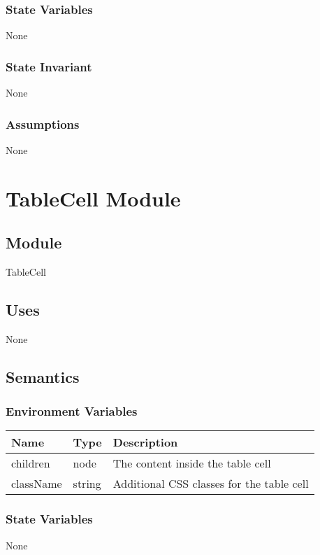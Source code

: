 \documentclass[12pt]{article}
\begin{document}
\subsubsection{State Variables}
None

\subsubsection{State Invariant}
None

\subsubsection{Assumptions}
None

\newpage


\section{TableCell Module}

\subsection{Module}
TableCell

\subsection{Uses}
None

\subsection{Semantics}

\subsubsection{Environment Variables}
\begin{tabular}{| l | l | p{10cm} |}
    \hline
    \textbf{Name} & \textbf{Type} & \textbf{Description}\\ \hline
    children & node & The content inside the table cell\\ \hline
    className & string & Additional CSS classes for the table cell\\ \hline
\end{tabular}

\subsubsection{State Variables}
None
\end{document}
